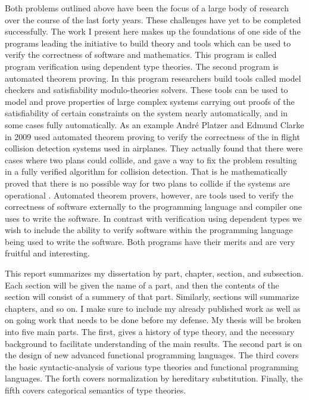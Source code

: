 Both problems outlined above have been the focus of a large body of
research over the course of the last forty years.  These challenges
have yet to be completed successfully.  The work I present here makes
up the foundations of one side of the programs leading the initiative
to build theory and tools which can be used to verify the correctness
of software and mathematics.  This program is called program
verification using dependent type theories.  The second program is
automated theorem proving.  In this program researchers build tools
called model checkers and satisfiability modulo-theories solvers.
These tools can be used to model and prove properties of large complex
systems carrying out proofs of the satisfiability of certain
constraints on the system nearly automatically, and in some cases
fully automatically.  As an example Andr\'{e} Platzer and Edmund
Clarke in 2009 used automated theorem proving to verify the
correctness of the in flight collision detection systems used in
airplanes.  They actually found that there were cases where two plans
could collide, and gave a way to fix the problem resulting in a fully
verified algorithm for collision detection.  That is he mathematically
proved that there is no possible way for two plans to collide if the
systems are operational \cite{DBLP:conf/fm/PlatzerC09}.  Automated
theorem provers, however, are tools used to verify the correctness of
software externally to the programming language and compiler one uses
to write the software.  In contrast with verification using dependent
types we wish to include the ability to verify software within the
programming language being used to write the software. Both programs
have their merits and are very fruitful and interesting.

This report summarizes my dissertation by part, chapter, section, and
subsection.  Each section will be given the name of a part, and then
the contents of the section will consist of a summery of that part.
Similarly, sections will summarize chapters, and so on.  I make sure
to include my already published work as well as on going work that
needs to be done before my defense.  My thesis will be broken into
five main parts.  The first, gives a history of type theory, and the
necessary background to facilitate understanding of the main
results. The second part is on the design of new advanced functional
programming languages.  The third covers the basic syntactic-analysis
of various type theories and functional programming languages.  The
forth covers normalization by hereditary substitution.  Finally, the
fifth covers categorical semantics of type theories.

